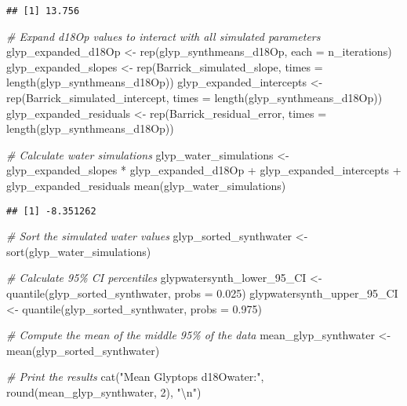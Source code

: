 \documentclass[
]{article}
\newenvironment{Shaded}{\begin{snugshade}}{\end{snugshade}}
\newcommand{\AttributeTok}[1]{\textcolor[rgb]{0.77,0.63,0.00}{#1}}
\newcommand{\CommentTok}[1]{\textcolor[rgb]{0.56,0.35,0.01}{\textit{#1}}}
\newcommand{\DecValTok}[1]{\textcolor[rgb]{0.00,0.00,0.81}{#1}}
\newcommand{\FloatTok}[1]{\textcolor[rgb]{0.00,0.00,0.81}{#1}}
\newcommand{\FunctionTok}[1]{\textcolor[rgb]{0.00,0.00,0.00}{#1}}
\newcommand{\NormalTok}[1]{#1}
\newcommand{\OtherTok}[1]{\textcolor[rgb]{0.56,0.35,0.01}{#1}}
\newcommand{\SpecialCharTok}[1]{\textcolor[rgb]{0.00,0.00,0.00}{#1}}
\newcommand{\StringTok}[1]{\textcolor[rgb]{0.31,0.60,0.02}{#1}}
\begin{document}
\begin{verbatim}
## [1] 13.756
\end{verbatim}

\begin{Shaded}
\begin{Highlighting}[]
\CommentTok{\# Expand d18Op values to interact with all simulated parameters}
\NormalTok{glyp\_expanded\_d18Op }\OtherTok{\textless{}{-}} \FunctionTok{rep}\NormalTok{(glyp\_synthmeans\_d18Op, }\AttributeTok{each =}\NormalTok{ n\_iterations)}
\NormalTok{glyp\_expanded\_slopes }\OtherTok{\textless{}{-}} \FunctionTok{rep}\NormalTok{(Barrick\_simulated\_slope, }\AttributeTok{times =} \FunctionTok{length}\NormalTok{(glyp\_synthmeans\_d18Op))}
\NormalTok{glyp\_expanded\_intercepts }\OtherTok{\textless{}{-}} \FunctionTok{rep}\NormalTok{(Barrick\_simulated\_intercept, }\AttributeTok{times =} \FunctionTok{length}\NormalTok{(glyp\_synthmeans\_d18Op))}
\NormalTok{glyp\_expanded\_residuals }\OtherTok{\textless{}{-}} \FunctionTok{rep}\NormalTok{(Barrick\_residual\_error, }\AttributeTok{times =} \FunctionTok{length}\NormalTok{(glyp\_synthmeans\_d18Op))}

\CommentTok{\# Calculate water simulations}
\NormalTok{glyp\_water\_simulations }\OtherTok{\textless{}{-}}\NormalTok{ glyp\_expanded\_slopes }\SpecialCharTok{*}\NormalTok{ glyp\_expanded\_d18Op }\SpecialCharTok{+}\NormalTok{ glyp\_expanded\_intercepts }\SpecialCharTok{+}\NormalTok{ glyp\_expanded\_residuals}
\FunctionTok{mean}\NormalTok{(glyp\_water\_simulations)}
\end{Highlighting}
\end{Shaded}

\begin{verbatim}
## [1] -8.351262
\end{verbatim}

\begin{Shaded}
\begin{Highlighting}[]
\CommentTok{\# Sort the simulated water values}
\NormalTok{glyp\_sorted\_synthwater }\OtherTok{\textless{}{-}} \FunctionTok{sort}\NormalTok{(glyp\_water\_simulations)}

\CommentTok{\# Calculate 95\% CI percentiles}
\NormalTok{glypwatersynth\_lower\_95\_CI }\OtherTok{\textless{}{-}} \FunctionTok{quantile}\NormalTok{(glyp\_sorted\_synthwater, }\AttributeTok{probs =} \FloatTok{0.025}\NormalTok{)}
\NormalTok{glypwatersynth\_upper\_95\_CI }\OtherTok{\textless{}{-}} \FunctionTok{quantile}\NormalTok{(glyp\_sorted\_synthwater, }\AttributeTok{probs =} \FloatTok{0.975}\NormalTok{)}

\CommentTok{\# Compute the mean of the middle 95\% of the data}
\NormalTok{mean\_glyp\_synthwater }\OtherTok{\textless{}{-}} \FunctionTok{mean}\NormalTok{(glyp\_sorted\_synthwater)}

\CommentTok{\# Print the results}
\FunctionTok{cat}\NormalTok{(}\StringTok{"Mean Glyptops d18Owater:"}\NormalTok{, }\FunctionTok{round}\NormalTok{(mean\_glyp\_synthwater, }\DecValTok{2}\NormalTok{), }\StringTok{"}\SpecialCharTok{\textbackslash{}n}\StringTok{"}\NormalTok{)}
\end{Highlighting}
\end{Shaded}
\end{document}
